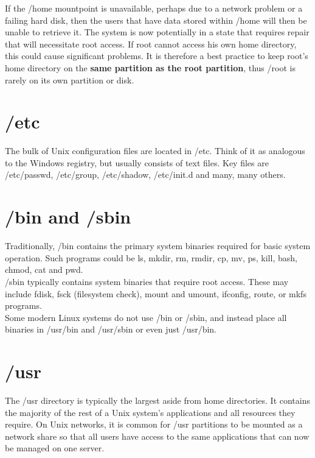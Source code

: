 If the /home mountpoint is unavailable, perhaps due to a network problem or a failing hard disk, then the users that have data stored within /home will then be unable to retrieve it.  The system is now potentially in a state that requires repair that will necessitate root access.  If root cannot access his own home directory, this could cause significant problems.  It is therefore a best practice to keep root's home directory on the \textbf{same partition as the root partition}, thus /root is rarely on its own partition or disk.\\

\section{/etc}

The bulk of Unix configuration files are located in /etc.  Think of it as analogous to the Windows registry, but usually consists of text files.  Key files are /etc/passwd, /etc/group, /etc/shadow, /etc/init.d and many, many others.

\section{/bin and /sbin}

Traditionally, /bin contains the primary system binaries required for basic system operation.  Such programs could be ls, mkdir, rm, rmdir, cp, mv, ps, kill, bash, chmod, cat and pwd.\\

/sbin typically contains system binaries that require root access.  These may include fdisk, fsck (filesystem check), mount and umount, ifconfig, route, or mkfs programs.\\

Some modern Linux systems do not use /bin or /sbin, and instead place all binaries in /usr/bin and /usr/sbin or even just /usr/bin.

\section{/usr}

The /usr directory is typically the largest aside from home directories.  It contains the majority of the rest of a Unix system's applications and all resources they require.  On Unix networks, it is common for /usr partitions to be mounted as a network share so that all users have access to the same applications that can now be managed on one server.

